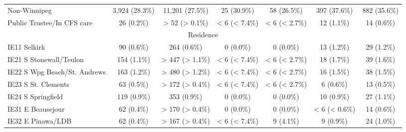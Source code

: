 \documentclass{article}
\begin{document}
\begin{table}[htbp]
\begin{tabular}{l*{6}{c}}
  Non-Winnipeg                                          &          3,924 (28.3\%)         &         11,201 (27.5\%)         &           25 (30.9\%)           &           58 (26.5\%)           &           397 (37.6\%)          &           882 (35.6\%)          \\
  Public Trustee/In CFS care                            &            26 (0.2\%)           &          > 52 (> 0.1\%)         &          < 6 (< 7.4\%)          &          < 6 (< 2.7\%)          &            12 (1.1\%)           &            14 (0.6\%)           \\
\multicolumn{7}{c}{Residence                                               }\\
  IE11 Selkirk                                          &            90 (0.6\%)           &           264 (0.6\%)           &            0 (0.0\%)            &            0 (0.0\%)            &            13 (1.2\%)           &            29 (1.2\%)           \\
  IE21 S Stonewall/Teulon                               &           154 (1.1\%)           &         > 447 (> 1.1\%)         &          < 6 (< 7.4\%)          &          < 6 (< 2.7\%)          &            18 (1.7\%)           &            39 (1.6\%)           \\
  IE22 S Wpg Beach/St. Andrews                          &           163 (1.2\%)           &         > 480 (> 1.2\%)         &          < 6 (< 7.4\%)          &          < 6 (< 2.7\%)          &            16 (1.5\%)           &            38 (1.5\%)           \\
  IE23 S St. Clements                                   &            63 (0.5\%)           &         > 172 (> 0.4\%)         &          < 6 (< 7.4\%)          &          < 6 (< 2.7\%)          &            6 (0.6\%)            &            13 (0.5\%)           \\
  IE24 S Springfield                                    &           119 (0.9\%)           &           353 (0.9\%)           &            0 (0.0\%)            &            0 (0.0\%)            &            10 (0.9\%)           &            27 (1.1\%)           \\
  IE31 E Beausejour                                     &            62 (0.4\%)           &         > 170 (> 0.4\%)         &            0 (0.0\%)            &            0 (0.0\%)            &          < 6 (< 0.6\%)          &            14 (0.6\%)           \\
  IE32 E Pinawa/LDB                                     &            62 (0.4\%)           &         > 167 (> 0.4\%)         &          < 6 (< 7.4\%)          &            9 (4.1\%)            &            9 (0.9\%)            &            24 (1.0\%)           \\

\end{tabular}
\end{table}
\end{document}

